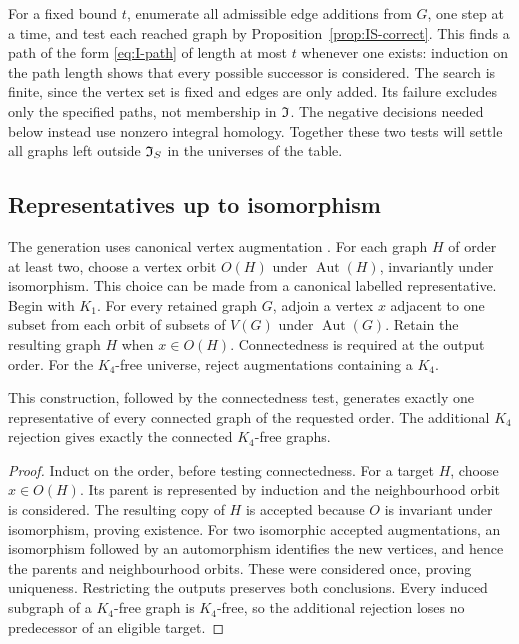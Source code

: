 For a fixed bound $t$, enumerate all admissible edge additions from
$G$, one step at a time, and test each reached graph by
Proposition~\ref{prop:IS-correct}. This finds a path of the form
\eqref{eq:I-path} of length at most $t$ whenever one exists: induction
on the path length shows that every possible successor is considered.
The search is finite, since the vertex set is fixed and edges are
only added. Its failure excludes only the specified paths, not
membership in $\mathfrak I$. The negative decisions needed below instead use
nonzero integral homology. Together these two tests will settle all
graphs left outside $\mathfrak I_S$ in the universes of the table.

\subsection{Representatives up to isomorphism}\label{sec:representatives}

The generation uses canonical vertex augmentation
\cite[Section~4]{McKay1998}. For each graph $H$ of order at least
two, choose a vertex orbit $O(H)$ under $\operatorname{Aut}(H)$,
invariantly under isomorphism. This choice can be made from a
canonical labelled representative. Begin with $K_1$. For every
retained graph $G$, adjoin a vertex $x$ adjacent to one subset from
each orbit of subsets of $V(G)$ under $\operatorname{Aut}(G)$.
Retain the resulting graph $H$ when $x\in O(H)$. Connectedness is
required at the output order. For the $K_4$-free universe, reject
augmentations containing a $K_4$.

\begin{proposition}\label{prop:enumeration-correct}
This construction, followed by the connectedness test, generates
exactly one representative of every connected graph of the requested
order. The additional $K_4$ rejection gives exactly the connected
$K_4$-free graphs.
\end{proposition}
\begin{proof}
Induct on the order, before testing connectedness. For a
target $H$, choose $x\in O(H)$. Its parent is represented by induction
and the neighbourhood orbit is considered. The resulting copy of
$H$ is accepted because $O$ is invariant under isomorphism, proving
existence.
For two isomorphic accepted augmentations, an isomorphism followed
by an automorphism identifies the new vertices, and hence the parents
and neighbourhood orbits. These were considered once, proving
uniqueness. Restricting the outputs preserves both conclusions.
Every induced subgraph of a $K_4$-free graph is $K_4$-free, so the
additional rejection loses no predecessor of an eligible target.
\end{proof}

